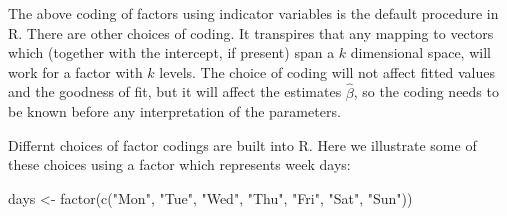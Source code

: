 \documentclass[
  a4paper,
]{article}
\newenvironment{Shaded}{\begin{snugshade}}{\end{snugshade}}
\newcommand{\FunctionTok}[1]{\textcolor[rgb]{0.00,0.00,0.00}{#1}}
\newcommand{\NormalTok}[1]{#1}
\newcommand{\OtherTok}[1]{\textcolor[rgb]{0.56,0.35,0.01}{#1}}
\newcommand{\StringTok}[1]{\textcolor[rgb]{0.31,0.60,0.02}{#1}}
\theoremstyle{definition}
\theoremstyle{definition}
\theoremstyle{definition}
\theoremstyle{definition}
\theoremstyle{remark}
\begin{document}
The above coding of factors using indicator variables is the default procedure
in R. There are other choices of coding. It transpires that any mapping to
vectors which (together with the intercept, if present) span a \(k\) dimensional
space, will work for a factor with \(k\) levels. The choice of coding will not
affect fitted values and the goodness of fit, but it will affect the estimates
\(\hat\beta\), so the coding needs to be known before any interpretation of the
parameters.

Differnt choices of factor codings are built into R. Here we illustrate some
of these choices using a factor which represents week days:

\begin{Shaded}
\begin{Highlighting}[]
\NormalTok{days }\OtherTok{\textless{}{-}} \FunctionTok{factor}\NormalTok{(}\FunctionTok{c}\NormalTok{(}\StringTok{"Mon"}\NormalTok{, }\StringTok{"Tue"}\NormalTok{, }\StringTok{"Wed"}\NormalTok{, }\StringTok{"Thu"}\NormalTok{, }\StringTok{"Fri"}\NormalTok{, }\StringTok{"Sat"}\NormalTok{, }\StringTok{"Sun"}\NormalTok{))}
\end{Highlighting}
\end{Shaded}
\end{document}
